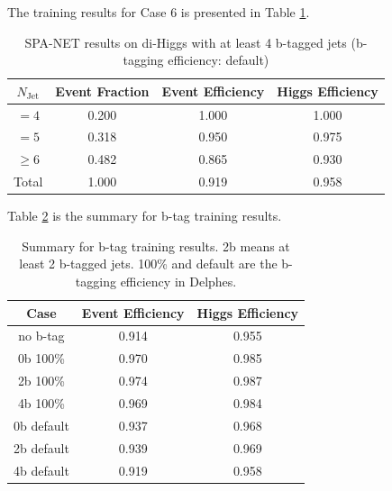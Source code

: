 \documentclass[12pt]{article}
\begin{document}
		The training results for Case 6 is presented in Table \ref{tab:SPANet_4btag_default}.
		\begin{table}[htpb]
			\centering
			\caption{SPA-NET results on di-Higgs with at least 4 b-tagged jets (b-tagging efficiency: default)}
			\label{tab:SPANet_4btag_default}
			\begin{tabular}{c|c|cc}
				$N_\text{Jet}$ & Event Fraction & Event Efficiency & Higgs Efficiency \\
				\hline
				$=4$	  &   0.200      &    1.000    &   1.000  \\
				$=5$	  &   0.318      &    0.950    &   0.975  \\
				$\ge 6$	  &   0.482      &    0.865    &   0.930  \\
				Total	  &   1.000      &    0.919    &   0.958  \\
			\end{tabular}
		\end{table}

		Table \ref{tab:comparision_btag_results} is the summary for b-tag training results.
		\begin{table}[htpb]
			\centering
			\caption{Summary for b-tag training results. 2b means at least 2 b-tagged jets. 100\% and default are the b-tagging efficiency in Delphes.}
			\label{tab:comparision_btag_results}
			\begin{tabular}{c|cc}
				Case & Event Efficiency & Higgs Efficiency \\
				\hline
				no b-tag	 &     0.914     &    0.955    \\
				0b 100\%	 &     0.970     &    0.985    \\
				2b 100\%	 &     0.974     &    0.987    \\
				4b 100\%	 &     0.969     &    0.984    \\
				0b default	 &     0.937     &    0.968    \\
				2b default	 &     0.939     &    0.969    \\
				4b default	 &     0.919     &    0.958    \\
			\end{tabular}
		\end{table}


\end{document}
